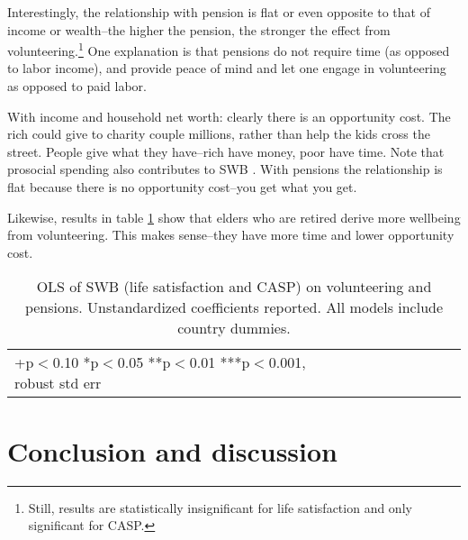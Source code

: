\documentclass[10pt, letterpaper]{article}
\begin{document}
\begin{spacing}{1.4}



Interestingly,  the
relationship with pension is flat or even opposite to that of income or wealth--the higher the
pension, the stronger the effect from volunteering.\footnote{Still, results are
statistically insignificant for life satisfaction and only significant for CASP.} One explanation is that
pensions do not require time (as opposed to labor income), and provide peace of
mind and let one engage in volunteering as opposed to paid labor. 

With income and household net worth: clearly there is an opportunity cost. The rich could give to charity couple
millions, rather than help the kids cross the street. People give what they
have--rich have money, poor have time.  Note that prosocial spending also
contributes to SWB \citep{aknin13}.
%
With pensions the relationship is flat because there is no opportunity cost--you
get what you get.



Likewise, results in table \ref{regEw6} show that elders
who are retired derive more wellbeing from volunteering. This makes sense--they
have more time and lower opportunity cost. 
%

\begin{spacing}{.9}
\begin{table}[H]\centering \caption{OLS of SWB  (life satisfaction and CASP) on
    volunteering and pensions.  Unstandardized coefficients reported. All models
  include country dummies.}  \begin{scriptsize} \begin{tabular}{p{1.8in}p{.5in}p{.5in}p{.5in}p{.5in}|p{.5in}p{.5in}p{.5in}p{.5in}p{.5in}p{.4in}p{.5in}p{.4in}}\hline 
      \hline\multicolumn{5}{l}{+p$<$0.10 *p$<$0.05 **p$<$0.01 ***p$<$0.001,
        robust std err} \end{tabular}\label{regEw6} \end{scriptsize}\end{table}
\end{spacing}





\section*{Conclusion and discussion}


\end{spacing}
\end{document}
